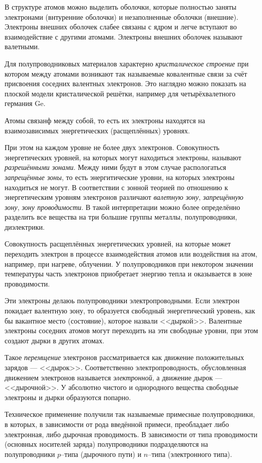 В структуре атомов можно выделить оболочки, которые полностью заняты электронами
(внтуренние оболочки) и незаполненные оболочки (внешние). Электроны внешних
оболочек слабее связаны с ядром и легче вступают во взаимодействие с другими
атомами. Электроны внешних оболочек называют валетными.

Для полупроводниковых материалов характерно \emph{кристалическое строение} при
котором между атомами возникают так называемые ковалентные связи за счёт
присвоения соседних валентных электронов. Это наглядно можно показать на плоской
модели кристалической решётки, например для четырёхвалетного германия Ge.

Атомы связанф между собой, то есть их электроны находятся на взаимозависимых
энергетических (расщеплённых) уровнях.

При этом на каждом уровне не более двух электронов. Совокупность энергетических
уровней, на которых могут находиться электроны, называют \emph{разрешёнными
	зонами}. Между ними будут в этом случае распологаться \emph{запрещённые зоны},
то есть энергитические уровни, на которых электроны находиться не могут. В
соответствии с зонной теорией по отношению к энергетическим уровням электронов
различают \emph{валетную зону}, \emph{запрещённую зону}, \emph{зону
	проводимости}. В такой интерпретации можно более определённо разделить все
вещества на три большие группы металлы, полупроводники, диэлектрики.

\begin{definition}
	Совокупность расщеплённых энергетических уровней, на которые может переходить
	электрон в процессе взаимодействия атомов или воздействия на атом, например,
	при нагреве, облучении. У полупроводников при некотором значении температуры
	часть электронов приобретает энергию тепла и оказывается в зоне проводимости.
\end{definition}

Эти электроны делаюь полупроводники электропроводными. Если электрон покидает
валентную зону, то образуется свободный энергетический уровень, как бы вакантное
место (состояние), которое назвали <<дыркой>>. Валентные электроны соседних
атомов могут переходить на эти свободные уровни, при этом создают дырки в других
атомах.

Такое \emph{перемщение} электронов рассматривается как движение положительных
зарядов --- <<дырок>>. Соответственно электропроводность, обусловленная
движением электронов называется \emph{электронной}, а движение дырок ---
<<дырочной>>. У абсолютно чистого и однородного вещества свободные электроны и
дырки образуются попарно.

Техническое применение получили так называемые примесные полупроводники, в
которых, в зависимости от рода введённой примеси, преобладает либо электронная,
либо дырочная проводимость. В зависимости от типа проводимости (основных
носителей заряда) полупроводники подразделяются на полупроводники $p$--типа
(дырочного пути) и $n$--типа (электронного типа).
